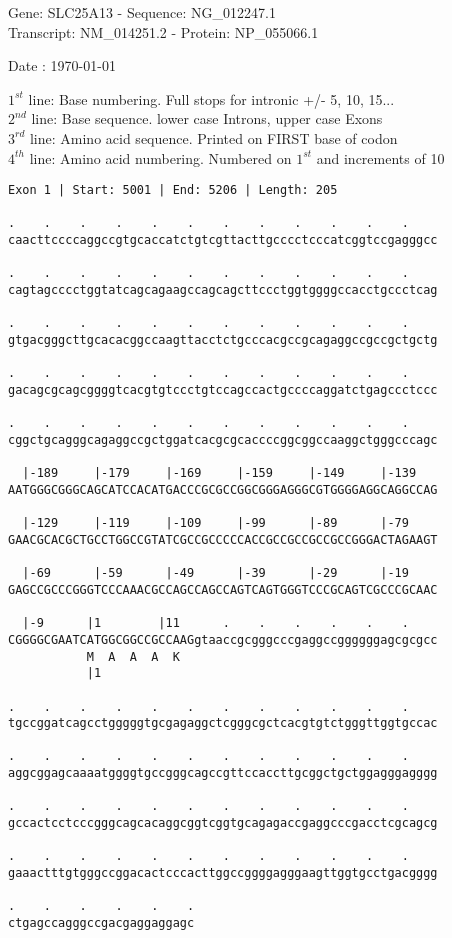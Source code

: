 \documentclass{article}
\begin{document}
\begin{center}
\begin{large}
Gene: SLC25A13 - Sequence: NG\_012247.1\\
Transcript: NM\_014251.2 - Protein: NP\_055066.1
 
 Date : \today
\end{large}
\end{center}
$1^{st}$ line: Base numbering. Full stops for intronic +/- 5, 10, 15...\\
$2^{nd}$ line: Base sequence. lower case Introns, upper case Exons\\
$3^{rd}$ line: Amino acid sequence. Printed on FIRST base of codon\\
$4^{th}$ line: Amino acid numbering. Numbered on $1^{st}$ and increments of 10\\
\begin{Verbatim}
Exon 1 | Start: 5001 | End: 5206 | Length: 205
 
.    .    .    .    .    .    .    .    .    .    .    .    
caacttccccaggccgtgcaccatctgtcgttacttgcccctcccatcggtccgagggcc
  
.    .    .    .    .    .    .    .    .    .    .    .    
cagtagcccctggtatcagcagaagccagcagcttccctggtggggccacctgccctcag
  
.    .    .    .    .    .    .    .    .    .    .    .    
gtgacgggcttgcacacggccaagttacctctgcccacgccgcagaggccgccgctgctg
  
.    .    .    .    .    .    .    .    .    .    .    .    
gacagcgcagcggggtcacgtgtccctgtccagccactgccccaggatctgagccctccc
  
.    .    .    .    .    .    .    .    .    .    .    .    
cggctgcagggcagaggccgctggatcacgcgcaccccggcggccaaggctgggcccagc
  
  |-189     |-179     |-169     |-159     |-149     |-139   
AATGGGCGGGCAGCATCCACATGACCCGCGCCGGCGGGAGGGCGTGGGGAGGCAGGCCAG
  
  |-129     |-119     |-109     |-99      |-89      |-79    
GAACGCACGCTGCCTGGCCGTATCGCCGCCCCCACCGCCGCCGCCGCCGGGACTAGAAGT
  
  |-69      |-59      |-49      |-39      |-29      |-19    
GAGCCGCCCGGGTCCCAAACGCCAGCCAGCCAGTCAGTGGGTCCCGCAGTCGCCCGCAAC
  
  |-9      |1        |11      .    .    .    .    .    .    
CGGGGCGAATCATGGCGGCCGCCAAGgtaaccgcgggcccgaggccggggggagcgcgcc
           M  A  A  A  K                                    
           |1                                               
  
.    .    .    .    .    .    .    .    .    .    .    .    
tgccggatcagcctgggggtgcgagaggctcgggcgctcacgtgtctgggttggtgccac
  
.    .    .    .    .    .    .    .    .    .    .    .    
aggcggagcaaaatggggtgccgggcagccgttccaccttgcggctgctggagggagggg
  
.    .    .    .    .    .    .    .    .    .    .    .    
gccactcctcccgggcagcacaggcggtcggtgcagagaccgaggcccgacctcgcagcg
  
.    .    .    .    .    .    .    .    .    .    .    .    
gaaactttgtgggccggacactcccacttggccggggagggaagttggtgcctgacgggg
  
.    .    .    .    .    .
ctgagccagggccgacgaggaggagc
\end{Verbatim}
\end{document}
